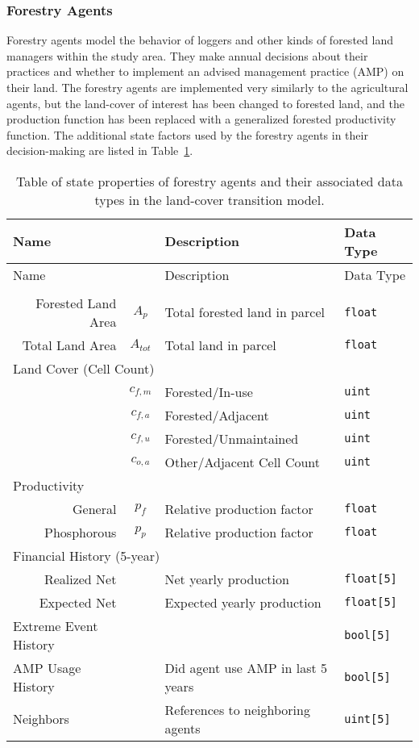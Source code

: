 \subsubsection*{Forestry Agents}

Forestry agents model the behavior of loggers and other kinds of
forested land managers within the study area.
They make annual decisions about their practices
and whether to implement an advised management practice (AMP)
on their land.
The forestry agents are implemented very similarly to the
agricultural agents, but the land-cover of interest has been changed
to forested land, and the production function has been replaced with
a generalized forested productivity function.
The additional state factors used by the forestry agents in their decision-making
are listed in Table~\ref{tab:land_state_for}.

\begin{longtable}{lcp{.4\linewidth}l}
\caption{Table of state properties of forestry agents and their
associated data types in the land-cover transition model.}
\label{tab:land_state_for} \\
\hline \hline
Name & & Description & Data Type \\ \hline
\endfirsthead
\hline \hline
Name & & Description & Data Type \\ \hline
\endhead
\hline\endfoot
\multicolumn{4}{l}{Land Parcel Data (sq~km)} \\
\multicolumn{1}{r}{Forested Land Area} & $A_p$ & Total forested land in parcel & \tt{float} \\
\multicolumn{1}{r}{Total Land Area} & $A_{tot}$ & Total land in parcel & \tt{float} \\
\multicolumn{4}{l}{Land Cover (Cell Count)} \\
& $c_{f,m}$ & Forested/In-use & \tt{uint} \\
& $c_{f,a}$ & Forested/Adjacent & \tt{uint} \\
& $c_{f,u}$ & Forested/Unmaintained & \tt{uint} \\
& $c_{o,a}$ & Other/Adjacent Cell Count & \tt{uint} \\
\multicolumn{4}{l}{Productivity} \\
\multicolumn{1}{r}{General} & $p_f$ 
    & Relative production factor & \tt{float} \\
\multicolumn{1}{r}{Phosphorous} & $p_p$
    & Relative production factor & \tt{float} \\
\multicolumn{4}{l}{Financial History (5-year)} \\
\multicolumn{1}{r}{Realized Net} && Net yearly production & \tt{float[5]} \\
\multicolumn{1}{r}{Expected Net} && Expected yearly production & \tt{float[5]} \\
Extreme Event History &&& \tt{bool[5]}\\
AMP Usage History && Did agent use AMP in last 5 years & \tt{bool[5]}\\
Neighbors & & References to neighboring agents & \tt{uint[5]} \\
\end{longtable}

